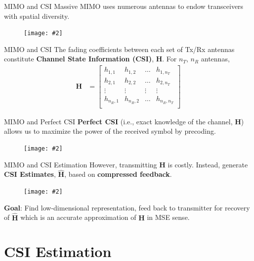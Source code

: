 \documentclass{beamer}
\newcommand{\fignocap}[2]{
	\begin{figure}[!hbtp]
	    \centering
		\texttt{[image: \#2]}
	\end{figure}
}
\renewcommand{\vec}[1]{\mathbf{#1}}
\begin{document}
	\begin{frame}{MIMO and CSI}
		Massive MIMO uses numerous antennas to endow transceivers with spatial diversity.
		\fignocap{0.8}{mimo-nopre.PNG}
	\end{frame}

	\begin{frame}{MIMO and CSI}
		The fading coefficients between each set of Tx/Rx antennas constitute \textbf{Channel State Information (CSI)}, $\mathbf{H}$. For $n_T$, $n_R$ antennas,
		\begin{align*}
			\mathbf{H}&=\begin{bmatrix}
							h_{1,1} & h_{1,2} & \dots  & h_{1,n_T} \\
							h_{2,1} & h_{2,2} & \dots  & h_{2,n_T} \\
							\vdots	& \vdots  & \vdots & \vdots    \\
							h_{n_{R},1} & h_{n_{R},2} & \dots  & h_{n_{R},n_T} \\
						\end{bmatrix}
		\end{align*}
	\end{frame}

	\begin{frame}{MIMO and Perfect CSI}
		\textbf{Perfect CSI} (i.e., exact knowledge of the channel, $\mathbf{H}$) allows us to maximize the power of the received symbol by precoding.
		\fignocap{0.8}{mimo-pre.PNG}
	\end{frame}

	\begin{frame}{MIMO and CSI Estimation}
		However, transmitting $\mathbf{H}$ is costly. Instead, generate \textbf{CSI Estimates}, $\hat{\mathbf{H}}$, based on \textbf{compressed feedback}.\\
		\fignocap{0.8}{mimo-feed.PNG}
    \textbf{Goal}: Find low-dimensional representation, feed back to transmitter for recovery of $\hat{\mathbf{H}}$ which is an accurate approximation of $\mathbf{H}$ in MSE sense. %
	\end{frame}

\section{CSI Estimation}
\end{document}
